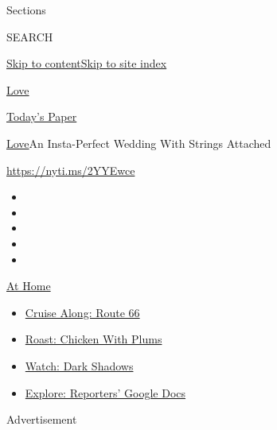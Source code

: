Sections

SEARCH

\protect\hyperlink{site-content}{Skip to
content}\protect\hyperlink{site-index}{Skip to site index}

\href{https://www.nytimes3xbfgragh.onion/section/fashion/weddings}{Love}

\href{https://myaccount.nytimes3xbfgragh.onion/auth/login?response_type=cookie\&client_id=vi}{}

\href{https://www.nytimes3xbfgragh.onion/section/todayspaper}{Today's
Paper}

\href{/section/fashion/weddings}{Love}\textbar{}An Insta-Perfect Wedding
With Strings Attached

\url{https://nyti.ms/2YYEwce}

\begin{itemize}
\item
\item
\item
\item
\item
\end{itemize}

\href{https://www.nytimes3xbfgragh.onion/spotlight/at-home?action=click\&pgtype=Article\&state=default\&region=TOP_BANNER\&context=at_home_menu}{At
Home}

\begin{itemize}
\tightlist
\item
  \href{https://www.nytimes3xbfgragh.onion/2020/09/07/travel/route-66.html?action=click\&pgtype=Article\&state=default\&region=TOP_BANNER\&context=at_home_menu}{Cruise
  Along: Route 66}
\item
  \href{https://www.nytimes3xbfgragh.onion/2020/09/04/dining/sheet-pan-chicken.html?action=click\&pgtype=Article\&state=default\&region=TOP_BANNER\&context=at_home_menu}{Roast:
  Chicken With Plums}
\item
  \href{https://www.nytimes3xbfgragh.onion/2020/09/04/arts/television/dark-shadows-stream.html?action=click\&pgtype=Article\&state=default\&region=TOP_BANNER\&context=at_home_menu}{Watch:
  Dark Shadows}
\item
  \href{https://www.nytimes3xbfgragh.onion/interactive/2020/at-home/even-more-reporters-editors-diaries-lists-recommendations.html?action=click\&pgtype=Article\&state=default\&region=TOP_BANNER\&context=at_home_menu}{Explore:
  Reporters' Google Docs}
\end{itemize}

Advertisement

